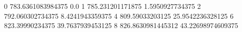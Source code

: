 0 783.6361083984375 0.0
1 785.231201171875 1.5950927734375
2 792.060302734375 8.4241943359375
4 809.59033203125 25.9542236328125
6 823.39990234375 39.7637939453125
8 826.8630981445312 43.22698974609375
